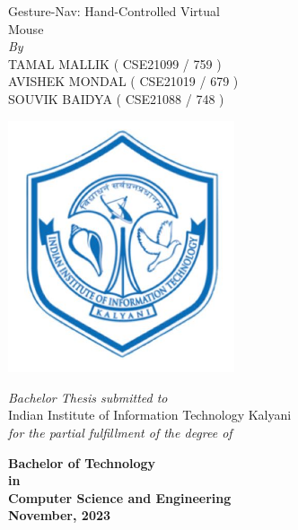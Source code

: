 \documentclass{article}
\newcommand{\mySpace}{0.3cm}
\begin{document}
\thispagestyle{empty}
\pagecolor{white}
\color{black}
\begin{titlepage}
    \centering
    {\Huge Gesture-Nav: Hand-Controlled Virtual \\ \vspace{0.4cm} Mouse\fontsize{24}{28.8}\selectfont {}\selectfont}\\
    
\vspace{\mySpace}
\vspace{0.1cm}
    \large \textit{By}\\
\vspace{\mySpace}
    {\Large TAMAL MALLIK ( CSE21099 / 759 ) \\
    \vspace{0.1cm}
    AVISHEK MONDAL ( CSE21019 / 679 ) \\
    \vspace{0.1cm}
    SOUVIK BAIDYA ( CSE21088  / 748 ) \\
    \fontsize{18}{22}\selectfont {}\selectfont
\vspace{\mySpace}}
    \begin{center}
        \includegraphics[width=0.5\textwidth]{iiitk_logo} %
    \end{center}
    {\Large \textit{Bachelor Thesis submitted to}\\
    \vspace{\mySpace}
    Indian Institute of Information Technology Kalyani \\ \vspace{\mySpace}
	 \textit{for the partial fulfillment of the degree of}\\ \vspace{\mySpace}

{\bfseries %
	 Bachelor of Technology \\
	 in \\
	 Computer Science and Engineering\\
\vspace{\mySpace}
	  November, 2023 \fontsize{18}{22}}\selectfont {}\selectfont}
    \vspace*{\fill}
\end{titlepage}
\clearpage
\pagecolor{white}
\color{black}
\end{document}
